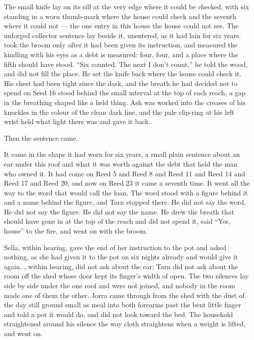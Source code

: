 The small knife lay on its sill at the very edge where it could be checked, with six standing in a worn thumb-mark where the house could check and the seventh where it could not --- the one entry in this house the house could not see. The unforged collector sentence lay beside it, unentered, as it had lain for six years.  took the broom only after it had been given its instruction, and measured the kindling with his eyes as a debt is measured: four, four, and a place where the fifth should have stood. “Six counted. The next I don't count,” he told the wood, and did not fill the place. He set the knife back where the house could check it. His chest had been tight since the dark, and the breath he had decided not to spend on Seed 16 stood behind the small interval at the top of each reach, a gap in the breathing shaped like a held thing. Ash was worked into the creases of his knuckles in the colour of the clean dark line, and the pale clip-ring at his left wrist held what light there was and gave it back.

Then the sentence came.

It came in the shape it had worn for six years, a small plain sentence about an ear under this roof and what it was worth against the debt that held the man who owned it. It had come on Reed 5 and Reed 8 and Reed 11 and Reed 14 and Reed 17 and Reed 20, and now on Reed 23 it came a seventh time. It went all the way to the word that would call the loan. The word stood with a figure behind it and a name behind the figure, and Tarn stopped there. He did not say the word. He did not say the figure. He did not say the name. He drew the breath that should have gone in at the top of the reach and did not spend it, said “Yes, house” to the fire, and went on with the broom.

Sella, within hearing, gave the end of her instruction to the pot and asked nothing, as she had given it to the pot on six nights already and would give it again. , within hearing, did not ask about the ear; Tarn did not ask about the room off the shed whose door kept its finger's width of open. The two silences lay side by side under the one roof and were not joined, and nobody in the room made one of them the other. Jorra came through from the shed with the dust of the day still ground small as meal into both forearms past the bent little finger and told a pot it would do, and did not look toward the bed. The household straightened around his silence the way cloth straightens when a weight is lifted, and went on.

